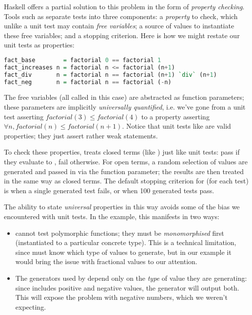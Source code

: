 Haskell offers a partial solution to this problem in the form of \emph{property
  checking}. Tools such as \qcheck{} separate tests into three components: a
\emph{property} to check, which unlike a unit test may contain \emph{free
  variables}; a source of values to instantiate these free variables; and a
stopping criterion. Here is how we might restate our unit tests as properties:

\begin{lstlisting}[language=Haskell, xleftmargin=.2\textwidth, xrightmargin=.2\textwidth]
fact_base        = factorial 0 == factorial 1
fact_increases n = factorial n <= factorial (n+1)
fact_div       n = factorial n == factorial (n+1) `div` (n+1)
fact_neg       n = factorial n == factorial (-n)
\end{lstlisting}

The free variables (all called  in this case) are abstracted as function
parameters; these parameters are implicitly \emph{universally quantified},
i.e. we've gone from a unit test asserting $factorial(3) \leq factorial(4)$ to a
property asserting $\forall n, factorial(n) \leq factorial(n+1)$. Notice that
unit tests like  are valid properties; they just assert rather
weak statements.

To check these properties, \qcheck{} treats closed terms (like )
just like unit tests: pass if they evaluate to , fail otherwise. For
open terms, a random selection of values are generated and passed in via the
function parameter; the results are then treated in the same way as closed
terms. The default stopping criterion for \qcheck{} (for each test) is when a
single generated test fails, or when 100 generated tests pass.

The ability to state \emph{universal} properties in this way avoids some of the
bias we encountered with unit tests. In the  example, this
manifests in two ways:

\begin{itemize}
\item \qcheck{} cannot test polymorphic functions; they must be
  \emph{monomorphised} first (instantiated to a particular concrete type). This
  is a technical limitation, since \qcheck{} must know which type of values to
  generate, but in our example it would bring the issue with fractional values
  to our attention.

\item The generators used by \qcheck{} depend only on the \emph{type} of value
  they are generating: since  includes positive and negative values, the
   generator will output both. This will expose the problem with
  negative numbers, which we weren't expecting.
\end{itemize}

